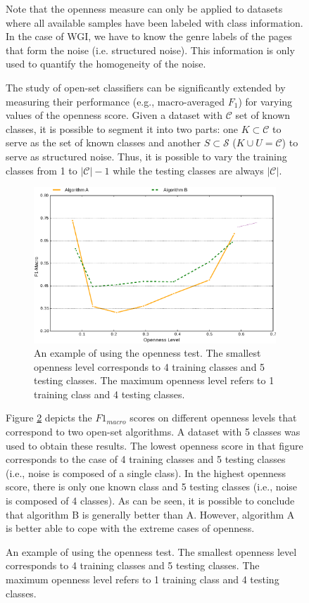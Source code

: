 \begin{figure}[p]
Note that the openness measure can only be applied to datasets where all available samples have been labeled with class information. In the case of WGI, we have to know the genre labels of the pages that form the noise (i.e. structured noise). This information is only used to quantify the homogeneity of the noise.

The study of open-set classifiers can be significantly extended by measuring their performance (e.g., macro-averaged $F_{1}$) for varying values of the openness score. Given a dataset with $\mathcal{C}$ set of known classes, it is possible to segment it into two parts: one $K \subset \mathcal{C}$ to serve as the set of known classes and another $S \subset  \mathcal{S}$ ($K \cup U = \mathcal{C}$) to serve as structured noise. Thus, it is possible to vary the training classes from 1 to $|\mathcal{C}|-1$ while the testing classes are always $|\mathcal{C}|$. 

\begin{figure}[t]
	\begin{center}
    	\includegraphics[scale=0.50]{Figures/openness_test_for_f1_scores_example.eps}
		\caption{An example of using the openness test. The smallest openness level corresponds to 4 training classes and 5 testing classes. The maximum openness level refers to 1 training class and 4 testing classes.}
		\label{chap:eval_methods:fig:openness}
	\end{center}
\end{figure}


Figure \ref{chap:eval_methods:fig:openness} depicts the $F1_{macro}$ scores on different openness levels that correspond to two open-set algorithms. A dataset with 5 classes was used to obtain these results. The lowest openness score in that figure corresponds to the case of 4 training classes and 5 testing classes (i.e., noise is composed of a single class). In the highest openness score, there is only one known class and 5 testing classes (i.e., noise is composed of 4 classes). As can be seen, it is possible to conclude that algorithm B is generally better than A. However, algorithm A is better able to cope with the extreme cases of openness.
 


\end{figure}
